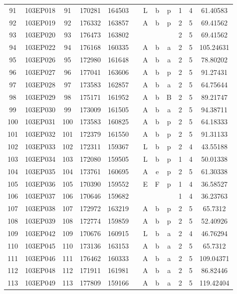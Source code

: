 \begin{tabular}{|*{12}{c|}}
91 & 103EP018 & 91 & 170281 & 164503 &  & L & b & p & 1 & 4 & 61.40583 \\ 
92 & 103EP019 & 92 & 176332 & 163857 &  & A & b & p & 2 & 5 & 69.41562 \\ 
93 & 103EP020 & 93 & 176473 & 163802 &  &  &  &  & 2 & 5 & 69.41562 \\ 
94 & 103EP022 & 94 & 176168 & 160335 &  & A & b & a & 2 & 5 & 105.24631 \\ 
95 & 103EP026 & 95 & 172980 & 161648 &  & A & b & a & 2 & 5 & 78.80202 \\ 
96 & 103EP027 & 96 & 177041 & 163606 &  & A & b & p & 2 & 5 & 91.27431 \\ 
97 & 103EP028 & 97 & 173583 & 162857 &  & A & b & a & 2 & 5 & 64.75644 \\ 
98 & 103EP029 & 98 & 175171 & 161952 &  & A & b & B & 2 & 5 & 89.21747 \\ 
99 & 103EP030 & 99 & 173009 & 161505 &  & A & b & a & 2 & 5 & 94.38711 \\ 
100 & 103EP031 & 100 & 173583 & 160825 &  & A & b & p & 2 & 5 & 64.18333 \\ 
101 & 103EP032 & 101 & 172379 & 161550 &  & A & b & p & 2 & 5 & 91.31133 \\ 
102 & 103EP033 & 102 & 172311 & 159367 &  & L & b & p & 2 & 4 & 43.55188 \\ 
103 & 103EP034 & 103 & 172080 & 159505 &  & L & b & p & 1 & 4 & 50.01338 \\ 
104 & 103EP035 & 104 & 173761 & 160695 &  & A & e & p & 2 & 5 & 61.30338 \\ 
105 & 103EP036 & 105 & 170390 & 159552 &  & E & F & p & 1 & 4 & 36.58527 \\ 
106 & 103EP037 & 106 & 170646 & 159682 &  &  &  &  & 1 & 4 & 36.23763 \\ 
107 & 103EP038 & 107 & 172972 & 163219 &  & A & b & p & 2 & 5 & 65.7312 \\ 
108 & 103EP039 & 108 & 172774 & 159859 &  & A & b & p & 2 & 5 & 52.40926 \\ 
109 & 103EP042 & 109 & 170676 & 160915 &  & L & b & a & 2 & 4 & 46.76294 \\ 
110 & 103EP045 & 110 & 173136 & 163153 &  & A & b & a & 2 & 5 & 65.7312 \\ 
111 & 103EP046 & 111 & 176462 & 160333 &  & A & b & a & 2 & 5 & 109.04371 \\ 
112 & 103EP048 & 112 & 171911 & 161981 &  & A & b & a & 2 & 5 & 86.82446 \\ 
113 & 103EP049 & 113 & 177809 & 159166 &  & A & b & a & 2 & 5 & 119.42404 \\ 

\end{tabular}
